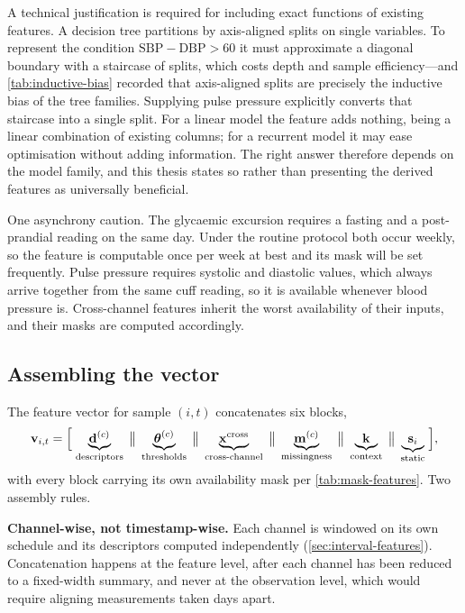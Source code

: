 \documentclass[12pt,a4paper,oneside]{report}
\begin{document}
A technical justification is required for including exact functions of existing features. A decision tree partitions by axis-aligned splits on single variables. To represent the condition $\mathrm{SBP} - \mathrm{DBP} > 60$ it must approximate a diagonal boundary with a staircase of splits, which costs depth and sample efficiency---and \cref{tab:inductive-bias} recorded that axis-aligned splits are precisely the inductive bias of the tree families. Supplying pulse pressure explicitly converts that staircase into a single split. For a linear model the feature adds nothing, being a linear combination of existing columns; for a recurrent model it may ease optimisation without adding information. The right answer therefore depends on the model family, and this thesis states so rather than presenting the derived features as universally beneficial.

One asynchrony caution. The glycaemic excursion requires a fasting and a post-prandial reading on the same day. Under the routine protocol both occur weekly, so the feature is computable once per week at best and its mask will be set frequently. Pulse pressure requires systolic and diastolic values, which always arrive together from the same cuff reading, so it is available whenever blood pressure is. Cross-channel features inherit the worst availability of their inputs, and their masks are computed accordingly.

\subsection{Assembling the vector}\label{sec:vector}

The feature vector for sample $(i,t)$ concatenates six blocks,
\begin{equation}
  \mathbf{v}_{i,t} = \Bigl[\;
  \underbrace{\mathbf{d}^{(c)}}_{\text{descriptors}} \;\big\|\;
  \underbrace{\boldsymbol{\theta}^{(c)}}_{\text{thresholds}} \;\big\|\;
  \underbrace{\mathbf{x}^{\text{cross}}}_{\text{cross-channel}} \;\big\|\;
  \underbrace{\mathbf{m}^{(c)}}_{\text{missingness}} \;\big\|\;
  \underbrace{\mathbf{k}}_{\text{context}} \;\big\|\;
  \underbrace{\mathbf{s}_i}_{\text{static}} \;\Bigr],
\end{equation}
with every block carrying its own availability mask per \cref{tab:mask-features}. Two assembly rules.

\textbf{Channel-wise, not timestamp-wise.} Each channel is windowed on its own schedule and its descriptors computed independently (\cref{sec:interval-features}). Concatenation happens at the feature level, after each channel has been reduced to a fixed-width summary, and never at the observation level, which would require aligning measurements taken days apart.
\end{document}
